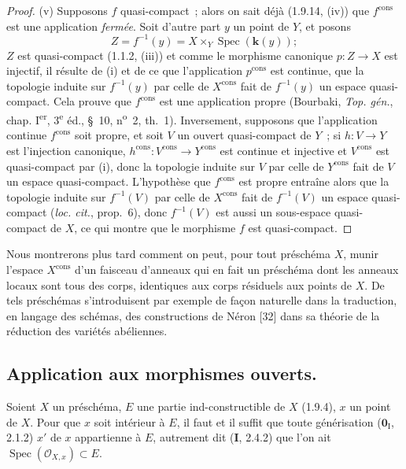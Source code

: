 \begin{proof}
(v) Supposons $f$ quasi-compact~; alors on sait déjà (1.9.14, (iv)) que
$f^{\mathrm{cons}}$ est une application \emph{fermée}. Soit d'autre part $y$ un
point de $Y$, et posons
\[
  Z=f^{-1}(y)=X\times_Y\operatorname{Spec}(\boldsymbol{k}(y));
\]
$Z$ est quasi-compact (1.1.2, (iii)) et comme le morphisme canonique
$p:Z\to X$ est injectif, il résulte de (i) et de ce que l'application
$p^{\mathrm{cons}}$ est continue, que la topologie induite sur $f^{-1}(y)$
par celle de $X^{\mathrm{cons}}$ fait de $f^{-1}(y)$ un espace quasi-compact.
Cela prouve que $f^{\mathrm{cons}}$ est une application propre (Bourbaki,
\emph{Top. gén.}, chap. I\textsuperscript{er}, 3\textsuperscript{e} éd.,
\S~10, n\textsuperscript{o}~2, th.~1). Inversement, supposons que
l'application continue $f^{\mathrm{cons}}$ soit propre, et soit $V$ un ouvert
quasi-compact de $Y$~; si $h:V\to Y$ est l'injection canonique,
$h^{\mathrm{cons}}:V^{\mathrm{cons}}\to Y^{\mathrm{cons}}$ est continue et
injective et $V^{\mathrm{cons}}$ est quasi-compact par (i), donc la topologie
induite sur $V$ par celle de $Y^{\mathrm{cons}}$ fait de $V$ un espace
quasi-compact. L'hypothèse que $f^{\mathrm{cons}}$ est propre entraîne alors
que la topologie induite sur $f^{-1}(V)$ par celle de $X^{\mathrm{cons}}$ fait
de $f^{-1}(V)$ un espace quasi-compact (\emph{loc. cit.}, prop.~6), donc
$f^{-1}(V)$ est aussi un sous-espace quasi-compact de $X$, ce qui montre que
le morphisme $f$ est quasi-compact.
\end{proof}

\begin{env}[1.9.16]
\label{IV.1.9.16-fr}
Nous montrerons plus tard comment on peut, pour tout préschéma $X$, munir
l'espace $X^{\mathrm{cons}}$ d'un faisceau d'anneaux qui en fait un préschéma
dont les anneaux locaux sont tous des corps, identiques aux corps résiduels aux
points de $X$. De tels préschémas s'introduisent par exemple de façon naturelle
dans la traduction, en langage des schémas, des constructions de
Néron [32] dans sa théorie de la réduction des variétés abéliennes.
\end{env}


\subsection{Application aux morphismes ouverts.}
\label{subsection:IV.1.10-fr}

\begin{theorem}[1.10.1]
\label{IV.1.10.1-fr}
Soient $X$ un préschéma, $E$ une partie ind-constructible de $X$ \textup{(1.9.4)}, $x$
un point de $X$. Pour que $x$ soit intérieur à $E$, il faut et il suffit que
toute générisation \textup{($\mathbf{0}_{\mathrm I}$, 2.1.2)} $x'$ de $x$ appartienne à $E$,
autrement dit \textup{(\textbf{I}, 2.4.2)} que l'on ait
$\operatorname{Spec}(\mathcal O_{X,x})\subset E$.
\end{theorem}

